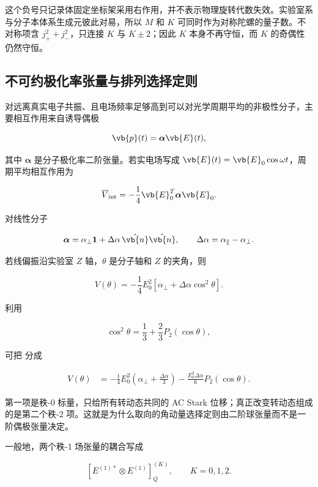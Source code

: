 这个负号只记录体固定坐标架采用右作用，并不表示物理旋转代数失效。实验室系与分子本体系生成元彼此对易，所以 \(M\) 和 \(K\) 可同时作为对称陀螺的量子数。不对称项含 \(j_+^2+j_-^2\)，只连接 \(K\) 与 \(K\pm2\)；因此 \(K\) 本身不再守恒，而 \(K\) 的奇偶性仍然守恒。

\subsection{不可约极化率张量与排列选择定则}
对远离真实电子共振、且电场频率足够高到可以对光学周期平均的非极性分子，主要相互作用来自诱导偶极

\[
\vb{p}(t)=\boldsymbol\alpha\vb{E}(t),
\]

其中 \(\boldsymbol\alpha\) 是分子极化率二阶张量。若实电场写成 \(\vb{E}(t)=\vb{E}_0\cos\omega t\)，周期平均相互作用为

\begin{equation}
\overline V_{\rm int}
=-\frac14\vb{E}_0^T\boldsymbol\alpha\vb{E}_0.
\label{eq:polarizability-cycle-averaged}
\end{equation}

对线性分子

\[
\boldsymbol\alpha
=\alpha_\perp\mathbf 1
+\Delta\alpha\,\hat{\vb{n}}\hat{\vb{n}},
\qquad
\Delta\alpha=\alpha_\parallel-\alpha_\perp.
\]

若线偏振沿实验室 \(Z\) 轴，\(\theta\) 是分子轴和 \(Z\) 的夹角，则

\begin{equation}
V(\theta)
=-\frac14E_0^2
[\alpha_\perp+\Delta\alpha\cos^2\theta].
\label{eq:linear-molecule-alignment-potential}
\end{equation}

利用

\[
\cos^2\theta
=\frac13+\frac23P_2(\cos\theta),
\]

可把  分成

\begin{align*}
V(\theta)
&=-\frac14E_0^2
\left(\alpha_\perp+\frac{\Delta\alpha}{3}\right)
-\frac{E_0^2\Delta\alpha}{6}P_2(\cos\theta).
\end{align*}

第一项是秩-0 标量，只给所有转动态共同的 AC Stark 位移；真正改变转动态组成的是第二个秩-2 项。这就是为什么取向的角动量选择定则由二阶球张量而不是一阶偶极张量决定。

一般地，两个秩-1 场张量的耦合写成

\[
[E^{(1)*}\otimes E^{(1)}]^{(K)}_Q,
\qquad K=0,1,2.
\]

